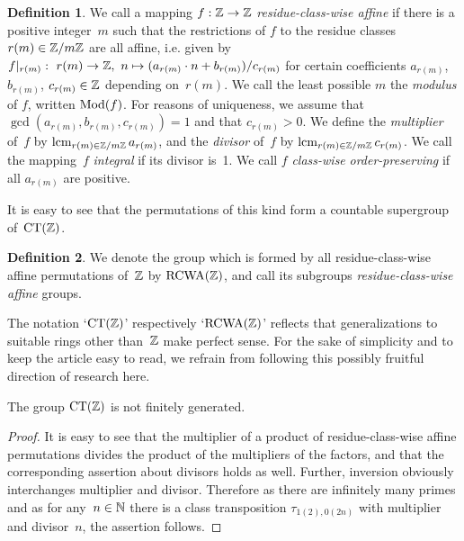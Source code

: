 \documentclass{amsart}
\theoremstyle{definition} \newtheorem{CTZDefinition}{Definition}[section]
\theoremstyle{plain}      \newtheorem{CTZPropertiesTheorem}[CTZDefinition]{Theorem}
\theoremstyle{plain}      \newtheorem{CTZSubgroupsTheorem}[CTZDefinition]{Theorem}
\theoremstyle{definition} \newtheorem{RcwaMappingDefinition}{Definition}[section]
\theoremstyle{definition} \newtheorem{RCWADefinition}[RcwaMappingDefinition]{Definition}
\theoremstyle{plain}      \newtheorem{CTZNotFinitelyGeneratedTheorem}
\theoremstyle{definition} \newtheorem{CTZSmEmbeddingDefinition}[RcwaMappingDefinition]{Definition}
\theoremstyle{plain}      \newtheorem{CTZHighlyTransitiveTheorem}[RcwaMappingDefinition]{Theorem}
\theoremstyle{plain}      \newtheorem{CTZTorsionElementsDivisibleTheorem}
\theoremstyle{plain}      \newtheorem{CTLemma}{Lemma}[section]
\theoremstyle{plain}      \newtheorem{IntegralCommutatorLemma}[CTLemma]{Lemma}
\theoremstyle{plain}      \newtheorem{NormalSubgroupContainsIntegralElementLemma}[CTLemma]{Lemma}
\theoremstyle{plain}      \newtheorem{CTZSimpleTheorem}[CTLemma]{Theorem}
\theoremstyle{remark}     \newtheorem{CTZSimpleRemark}[CTLemma]{Remark}
\theoremstyle{definition} \newtheorem{CTPZDefinition}[CTLemma]{Definition}
\theoremstyle{plain}      \newtheorem{CTPZSimpleCorollary}[CTLemma]{Corollary}
\theoremstyle{plain}      \newtheorem{CTPZSimpleProblem}[CTLemma]{Problem}
\theoremstyle{plain}      \newtheorem{FnPSL2ZEmbeddingTheorem}{Theorem}[section]
\theoremstyle{plain}      \newtheorem{FreeProductEmbeddingTheorem}[FnPSL2ZEmbeddingTheorem]{Theorem}
\theoremstyle{definition} \newtheorem{RestrictionMonomorphismDefinition}
\theoremstyle{plain}      \newtheorem{DirectAndWreathProductsEmbeddingTheorem}
\theoremstyle{plain}      \newtheorem{DirectAndWreathProductsEmbeddingCorollary}
\theoremstyle{definition} \newtheorem{CTintZDefinition}[FnPSL2ZEmbeddingTheorem]{Definition}
\theoremstyle{plain}      \newtheorem{CTintZSimpleTheorem}[FnPSL2ZEmbeddingTheorem]{Theorem}
\theoremstyle{definition} \newtheorem{KernelDefinition}{Definition}[section]
\theoremstyle{definition} \newtheorem{TameWildDefinition}[KernelDefinition]{Definition}
\theoremstyle{definition} \newtheorem{SimpleSupergroupsDefinition}[KernelDefinition]{Definition}
\theoremstyle{definition} \newtheorem{CSCRDefinition}[KernelDefinition]{Definition}
\theoremstyle{plain}      \newtheorem{SimpleSupergroupsGeneratorsTheorem}[KernelDefinition]{Theorem}
\theoremstyle{plain}      \newtheorem{SimpleSupergroupsTheorem}[KernelDefinition]{Theorem}
\theoremstyle{plain}      \newtheorem{SimpleSupergroupsTransitivityTheorem}
\theoremstyle{plain}      \newtheorem{TameGenerationConjecture}[KernelDefinition]{Conjecture}
\theoremstyle{remark}     \newtheorem{TameGenerationRemark}[KernelDefinition]{Remark}
\begin{document}
\begin{RcwaMappingDefinition} \label{RcwaMappingDefinition}
  We call a mapping \(f: \mathbb{Z} \rightarrow \mathbb{Z}\) \emph{residue-class-wise affine} if there
  is a positive integer~\(m\) such that the restrictions of \(f\) to the residue classes
  \(r(m) \in \mathbb{Z}/m\mathbb{Z}\) are all affine, i.e. given by
  \(f|_{r(m)}: \ r(m) \rightarrow \mathbb{Z}, \ n \mapsto (a_{r(m)} \cdot n + b_{r(m)})/c_{r(m)}\)
  for certain coefficients \(a_{r(m)}\), \(b_{r(m)}\), \(c_{r(m)} \in \mathbb{Z}\) depending on~\(r(m)\).
  We call the least possible \(m\) the \emph{modulus} of \(f\), written \(\Mod{f}\).
  For reasons of uniqueness, we assume that \(\gcd(a_{r(m)},b_{r(m)},c_{r(m)}) = 1\)
  and that \(c_{r(m)} > 0\).
  We define the \emph{multiplier} of~\(f\) by \(\lcm_{r(m) \in \ZZ/m\ZZ} a_{r(m)}\),
  and the \emph{divisor} of~\(f\) by \(\lcm_{r(m) \in \ZZ/m\ZZ} c_{r(m)}\).
  We call the mapping~\(f\) \emph{integral} if its divisor is~1. We call \(f\) \emph{class-wise}
  \emph{order-preserving} if all \(a_{r(m)}\) are positive.
\end{RcwaMappingDefinition}

It is easy to see that the permutations of this kind form a countable supergroup of~\(\CT{\ZZ}\).

\begin{RCWADefinition} \label{RCWADefinition}
  We denote the group which is formed by all residue-class-wise affine permutations of~\(\mathbb{Z}\)
  by \(\RCWA{\ZZ}\), and call its subgroups \emph{residue-class-wise affine} groups.
\end{RCWADefinition}

The notation `\(\CT{\ZZ}\)' respectively `\(\RCWA{\ZZ}\)' reflects that generalizations to
suitable rings other than~\(\mathbb{Z}\) make perfect sense. For the sake of simplicity and to keep the
article easy to read, we refrain from following this possibly fruitful direction of research here.

\goodbreak

\begin{CTZNotFinitelyGeneratedTheorem} \label{CTZNotFinitelyGeneratedTheorem}
  The group \(\CT{\ZZ}\) is not finitely generated.
\end{CTZNotFinitelyGeneratedTheorem}
\begin{proof}
  It is easy to see that the multiplier of a product of residue-class-wise affine permutations
  divides the product of the multipliers of the factors, and that the corresponding assertion about
  divisors holds as well. Further, inversion obviously interchanges multiplier and divisor.
  Therefore as there are infinitely many primes and as for any~\(n \in \mathbb{N}\) there is a class
  transposition \(\tau_{1(2),0(2n)}\) with multiplier and divisor~\(n\), the assertion follows.
\end{proof}
\end{document}
